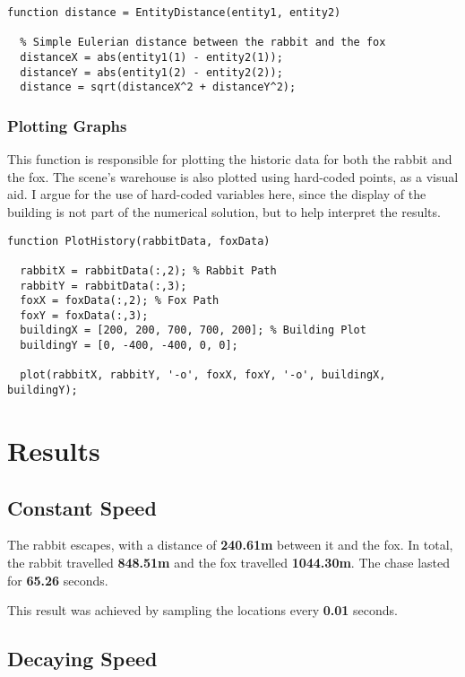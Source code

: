 \documentclass[11pt]{article}
\begin{document}
\begin{lstlisting}
function distance = EntityDistance(entity1, entity2)
  
  % Simple Eulerian distance between the rabbit and the fox
  distanceX = abs(entity1(1) - entity2(1));
  distanceY = abs(entity1(2) - entity2(2));
  distance = sqrt(distanceX^2 + distanceY^2);

\end{lstlisting}

\subsubsection{Plotting Graphs}

This function is responsible for plotting the historic data for both the rabbit and the fox. The scene's warehouse is also plotted using hard-coded points, as a visual aid. I argue for the use of hard-coded variables here, since the display of the building is not part of the numerical solution, but to help interpret the results.

\begin{lstlisting}
function PlotHistory(rabbitData, foxData)
  
  rabbitX = rabbitData(:,2); % Rabbit Path
  rabbitY = rabbitData(:,3);
  foxX = foxData(:,2); % Fox Path
  foxY = foxData(:,3);
  buildingX = [200, 200, 700, 700, 200]; % Building Plot
  buildingY = [0, -400, -400, 0, 0];
  
  plot(rabbitX, rabbitY, '-o', foxX, foxY, '-o', buildingX, buildingY);
\end{lstlisting}

\section{Results}
\label{sec:results}

\subsection{Constant Speed}

The rabbit escapes, with a distance of \textbf{240.61m} between it and the fox. In total, the rabbit travelled \textbf{848.51m} and the fox travelled \textbf{1044.30m}. The chase lasted for \textbf{65.26} seconds. 

This result was achieved by sampling the locations every \textbf{0.01} seconds.

\subsection{Decaying Speed}
\end{document}
